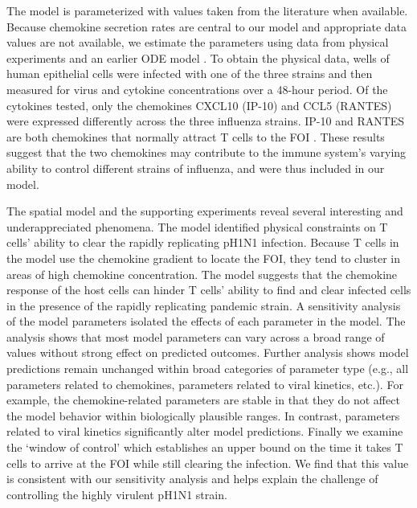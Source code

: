 \documentclass[preprint,10pt,authoryear]{elsarticle}
\begin{document}
The model is parameterized with values taken from the literature when available.  Because chemokine secretion rates are central to our model and appropriate data values are not available, we estimate the parameters using data from physical experiments and an earlier ODE model \citep{Mitchell2011}.   To obtain the physical data, wells of human epithelial cells were infected with one of the three strains and then measured for virus and cytokine concentrations over a 48-hour period.   Of the cytokines tested, only the chemokines CXCL10 (IP-10) and CCL5 (RANTES) were expressed differently across the three influenza strains.   IP-10 and RANTES are both chemokines that normally attract T cells to the FOI \citep{Hoji2005, Groom2011a}.  These results suggest that the two chemokines may contribute to the immune system's varying ability to control different strains of influenza, and were thus included in our model.

The spatial model and the supporting experiments reveal several interesting and underappreciated phenomena.  The model identified physical constraints on T cells' ability to clear the rapidly replicating pH1N1 infection. Because T cells in the model use the chemokine gradient to locate the FOI, they tend to cluster in areas of high chemokine concentration. The model suggests that the chemokine response of the host cells can hinder T cells’ ability to find and clear infected cells in the presence of the rapidly replicating pandemic strain. A sensitivity analysis of the model parameters isolated the effects of each parameter in the model.  The analysis shows that most model parameters can vary across a broad range of values without strong effect on predicted outcomes.  Further analysis shows model predictions remain unchanged within broad categories of parameter type (e.g., all parameters related to chemokines, parameters related to viral kinetics, etc.).  For example, the chemokine-related parameters are stable in that they do not affect the model behavior within biologically plausible ranges. In contrast, parameters related to viral kinetics significantly alter model predictions.  Finally we examine the `window of control' which establishes an upper bound on the time it takes T cells to arrive at the FOI while still clearing the infection.  We find that this value is consistent with our sensitivity analysis and helps explain the challenge of controlling the highly virulent pH1N1 strain.



\end{document}

